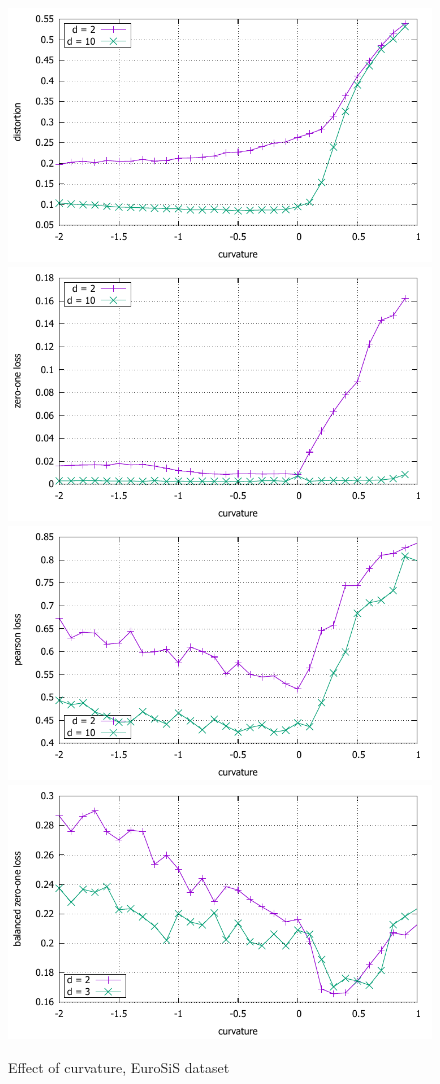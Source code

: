 \documentclass{article} %
\begin{document}
\begin{figure}
    \centering
    \includegraphics[width = 0.49 \textwidth]{EuroSiS_distortion.pdf}
    \includegraphics[width = 0.49 \textwidth]{EuroSiS_zero_one.pdf}
    \includegraphics[width = 0.49 \textwidth]{EuroSiS_pearson.pdf}
    \includegraphics[width = 0.49 \textwidth]{EuroSiS_balanced_zero_one.pdf}
    \caption{Effect of curvature, EuroSiS dataset}
    \label{fig:EurodSiS}
\end{figure}
\end{document}
